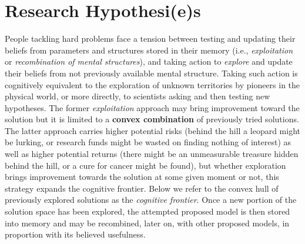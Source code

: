 \section{Research Hypothesi(e)s}
People tackling hard problems face a tension between testing and updating their beliefs from parameters and structures stored in their memory (i.e., {\it exploitation} or {\it recombination of mental structures}), and taking action to {\it explore} and update their beliefs from not previously available mental structure. Taking such action is cognitively equivalent to the exploration of unknown territories by pioneers in the physical world, or more directly, to scientists asking and then testing new hypotheses. The former {\it exploitation} approach may bring improvement toward the solution but it is limited to a {\bf convex combination} of previously tried solutions. The latter approach carries higher potential risks (behind the hill a leopard might be lurking, or research funds might be wasted on finding nothing of interest) as well as higher potential returns (there might be an unmeasurable treasure hidden behind the hill, or a cure for cancer might be found), but whether exploration brings improvement towards the solution at some given moment or not, this strategy expands the cognitive frontier. Below we refer to the convex hull of previously explored solutions as the {\it cognitive frontier}.  Once a new portion of the solution space has been explored, the attempted proposed model is then stored into memory and may be recombined, later on, with other proposed models, in proportion with its believed usefulness. \\

